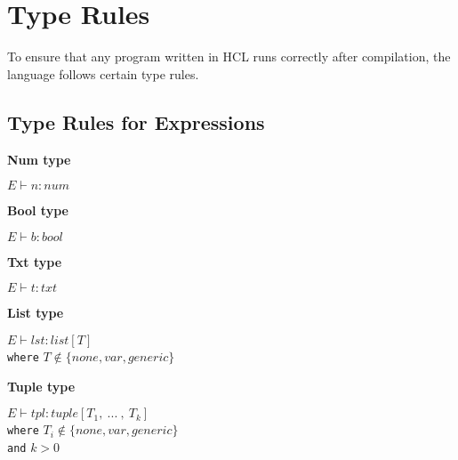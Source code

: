\section{Type Rules}
To ensure that any program written in HCL runs correctly after compilation, the language follows certain type rules.


\subsection{Type Rules for Expressions}
\textbf{Num type}\\
\begin{center}
	\begin{math}
		E \vdash n : num
	\end{math}
\end{center}

\textbf{Bool type}\\
\begin{center}
	\begin{math}
	E \vdash b : bool
	\end{math}
\end{center}

\textbf{Txt type}\\
\begin{center}
	\begin{math}
	E \vdash t : txt
	\end{math}
\end{center}

\textbf{List type}\\
\begin{center}
	\begin{math}
	E \vdash lst : list[T]
	\end{math}
	\\[1\baselineskip]
	\texttt{where} $T \notin \{none, var, generic\}$
\end{center}

\textbf{Tuple type}\\
\begin{center}
	\begin{math}
	E \vdash tpl : tuple[T_1, \ .
	.
	.
	\ ,\ T_k]
	\end{math}
	\\[1\baselineskip]
	\texttt{where} $T_i \notin \{none, var, generic\}$\\
	\texttt{and} $k > 0$
\end{center}


